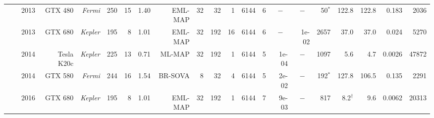 \begin{table}
\begin{adjustbox}{angle=90}
{{\begin{tabular}{|r|r|r||r|r|r|r|r|r|r|r|r|r|r||r|r|r|r||r|r|r|}
                                                                 & \cite{Xianjun2013}              & 2013                  & GTX 480                  & \textit{Fermi}                   & 250                  & 15                 & 1.40                   & EML-MAP                  & 32                  & 32                  & 1                   & 6144                  & 6                  & \multicolumn{1}{c|}{$-$}      & \multicolumn{1}{c|}{$-$} &     50$^*$    &  122.8           & 122.8          & 0.183         &   2036             \\ \cline{2-21}
                                                                 & \cite{Wu2013}                   & 2013                  & GTX 680                  & \textit{Kepler}                  & 195                  & 8                  & 1.01                   & EML-MAP                  & 32                  & 192                 & 16                  & 6144                  & 6                  & \multicolumn{1}{c|}{$-$}      & 1e-02                    &   2657        &   37.0           &  37.0          & 0.024         &   5270             \\ \cline{2-21}
                                                                 & \cite{Zhang2014}                & 2014                  & Tesla K20c               & \textit{Kepler}                  & 225                  & 13                 & 0.71                   &  ML-MAP                  & 32                  & 192                 & 1                   & 6144                  & 5                  & 1e-04                         & \multicolumn{1}{c|}{$-$} &   1097        &    5.6           &   4.7          & 0.0026        &  47872             \\ \cline{2-21}
                                                                 & \cite{Li2014}                   & 2014                  & GTX 580                  & \textit{Fermi}                   & 244                  & 16                 & 1.54                   & BR-SOVA                  & 8                   & 32                  & 4                   & 6144                  & 5                  & 2e-02                         & \multicolumn{1}{c|}{$-$} &    192$^*$    &  127.8           & 106.5          & 0.135         &   2291             \\ \cline{2-21}
                                                                 & \multirow{2}{*}{\cite{Li2016a}} & \multirow{2}{*}{2016} & \multirow{2}{*}{GTX 680} & \multirow{2}{*}{\textit{Kepler}} & \multirow{2}{*}{195} & \multirow{2}{*}{8} & \multirow{2}{*}{1.01}  & EML-MAP                  & \multirow{2}{*}{32} & \multirow{2}{*}{192} & \multirow{2}{*}{1} & \multirow{2}{*}{6144} & 7                  & \multirow{2}{*}{9e-03}        & \multicolumn{1}{c|}{$-$} &    817        &    8.2$^\dagger$ &   9.6          & 0.0062        &  20313             \\ \cline{9-9} \cline{14-14} \cline{16-21}

\end{tabular}}}
\end{adjustbox}
\end{table}
